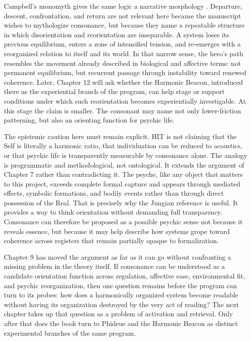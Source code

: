 Campbell's monomyth gives the same logic a narrative morphology \parencite{campbell_1949}. Departure, descent, confrontation, and return are not relevant here because the manuscript wishes to mythologize consonance, but because they name a repeatable structure in which disorientation and reorientation are inseparable. A system loses its previous equilibrium, enters a zone of intensified tension, and re-emerges with a reorganized relation to itself and its world. In that narrow sense, the hero's path resembles the movement already described in biological and affective terms: not permanent equilibrium, but recurrent passage through instability toward renewed coherence. Later, Chapter 12 will ask whether the Harmonic Beacon, introduced there as the experiential branch of the program, can help stage or support conditions under which such reorientation becomes experientially investigable. At this stage the claim is smaller. The consonant may name not only lower-friction patterning, but also an orienting function for psychic life.

The epistemic caution here must remain explicit. HIT is not claiming that the Self is literally a harmonic ratio, that individuation can be reduced to acoustics, or that psychic life is transparently measurable by consonance alone. The analogy is programmatic and methodological, not ontological. It extends the argument of Chapter 7 rather than contradicting it. The psyche, like any object that matters to this project, exceeds complete formal capture and appears through mediated effects, symbolic formations, and bodily events rather than through direct possession of the Real. That is precisely why the Jungian reference is useful. It provides a way to think orientation without demanding full transparency. Consonance can therefore be proposed as a possible psychic sense not because it reveals essence, but because it may help describe how systems grope toward coherence across registers that remain partially opaque to formalization.

Chapter 9 has moved the argument as far as it can go without confronting a missing problem in the theory itself. If consonance can be understood as a candidate orientation function across regulation, affective ease, environmental fit, and psychic reorganization, then one question remains before the program can turn to its probes: how does a harmonically organized system become readable without having its organization destroyed by the very act of reading? The next chapter takes up that question as a problem of activation and retrieval. Only after that does the book turn to Phideus and the Harmonic Beacon as distinct experimental branches of the same program.
